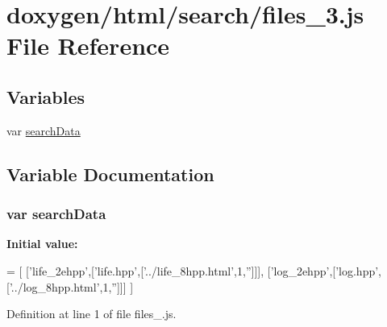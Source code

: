 \hypertarget{a00076}{}\section{doxygen/html/search/files\+\_\+3.js File Reference}
\label{a00076}
\subsection*{Variables}
\begin{DoxyCompactItemize}
\item 
var \hyperlink{a00076_ad01a7523f103d6242ef9b0451861231e}{search\+Data}
\end{DoxyCompactItemize}


\subsection{Variable Documentation}
\hypertarget{a00076_ad01a7523f103d6242ef9b0451861231e}{}
\subsubsection[{search\+Data}]{\setlength{\rightskip}{0pt plus 5cm}var search\+Data}\label{a00076_ad01a7523f103d6242ef9b0451861231e}
{\bfseries Initial value\+:}
\begin{DoxyCode}
=
[
  [\textcolor{stringliteral}{'life\_2ehpp'},[\textcolor{stringliteral}{'life.hpp'},[\textcolor{stringliteral}{'../life\_8hpp.html'},1,\textcolor{stringliteral}{''}]]],
  [\textcolor{stringliteral}{'log\_2ehpp'},[\textcolor{stringliteral}{'log.hpp'},[\textcolor{stringliteral}{'../log\_8hpp.html'},1,\textcolor{stringliteral}{''}]]]
]
\end{DoxyCode}


Definition at line 1 of file files\+\_.\+js.


